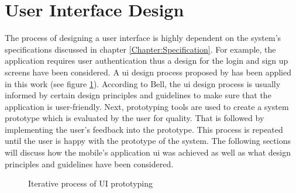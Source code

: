     
        
    \section{User Interface Design}
    \label{section:user_interface_design}
    The process of designing a user interface is highly dependent on the system's specifications discussed in chapter \ref{Chapter:Specification}. For example, the application requires user authentication thus a design for the login and sign up screens have been considered. A \gls{ui} design process proposed by \citet[60]{bell2005} has been applied in this work (see figure \ref{figure:ui-design-process}). According to Bell, the \gls{ui} design process is usually informed by certain design principles and guidelines to make sure that the application is user-friendly. Next, prototyping tools are used to create a system prototype which is evaluated by the user for quality. That is followed by implementing the user's feedback into the prototype. This process is repeated until the user is happy with the prototype of the system. The following sections will discuss how the mobile's application \gls{ui} was achieved as well as what design principles and guidelines have been considered.
    
    \begin{figure}[ht]
    \centering
    \caption{Iterative process of UI prototyping}
    \label{figure:ui-design-process}
    \end{figure}
    
